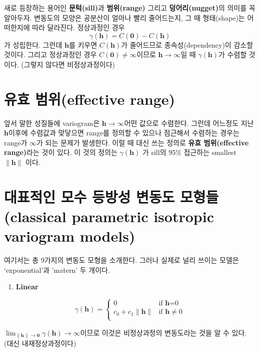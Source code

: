 \documentclass[b5paper,]{scrbook}
\providecommand{\tightlist}{%
  \setlength{\itemsep}{0pt}\setlength{\parskip}{0pt}}
\theoremstyle{plain}
\theoremstyle{definition}
\numberwithin{equation}{section}
\begin{document}
새로 등장하는 용어인 \textbf{문턱(sill)}과 \textbf{범위(range)} 그리고 \textbf{덩어리(nugget)}의 의미를 꼭 알아두자. 변동도의 모양은 공분산이 얼마나 빨리 줄어드는지, 그 때 형태(shape)는 어떠한지에 따라 달라진다. 정상과정인 경우
\[\gamma(\mathbf{h})=C(\mathbf{0})-C(\mathbf{h})\]
가 성립한다. 그런데 \(\mathbf{h}\)를 키우면 \(C(\mathbf{h})\)가 줄어드므로 종속성(dependency)이 감소할 것이다. 그리고 정상과정인 경우 \(C(\mathbf{0})\neq \infty\)이므로 \(\mathbf{h} \rightarrow \infty\)일 때 \(\gamma(\mathbf{h})\)가 수렴할 것이다. (그렇지 않다면 비정상과정이다)

\hypertarget{-effective-range}{%
\section{유효 범위(effective range)}\label{-effective-range}}

앞서 말한 성질들에 variogram은 \(\mathbf{h} \rightarrow \infty\)어떤 값으로 수렴한다. 그런데 어느정도 지난 \(\mathbf{h}\)이후에 수렴값과 맞닿으면 range를 정의할 수 있으나 점근해서 수렴하는 경우는 range가 \(\infty\)가 되는 문제가 발생한다. 이럴 때 대신 쓰는 정의로 \textbf{유효 범위(effective range)}라는 것이 있다. 이 것의 정의는 \(\gamma(\mathbf{h})\) 가 sill의 95\% 접근하는 smallest \(\|\mathbf{h}\|\) 이다.

\hypertarget{----classical-parametric-isotropic-variogram-models}{%
\section{대표적인 모수 등방성 변동도 모형들(classical parametric isotropic variogram models)}\label{----classical-parametric-isotropic-variogram-models}}

여기서는 총 9가지의 변동도 모형을 소개한다. 그러나 실제로 널리 쓰이는 모델은 `exponential'과 'matern' 두 개이다.

\begin{enumerate}
\def\labelenumi{\arabic{enumi}.}
\tightlist
\item
  \textbf{Linear}
\end{enumerate}

\[
\gamma(\mathbf{h})= \left\{ \begin{array}{ll}
0 & \textrm{if $\mathbf{h}$=0}\\
c_{0}+c_{1}\| \mathbf{h}\| & \textrm{if $\mathbf{h}\neq 0$}\\
\end{array} \right.
\]

\(\lim_{\|\mathbf{h}\| \rightarrow \mathbf{0}}\gamma(\mathbf{h}) \rightarrow \infty\)이므로 이것은 비정상과정의 변동도라는 것을 알 수 있다. (대신 내재정상과정이다)
\end{document}

